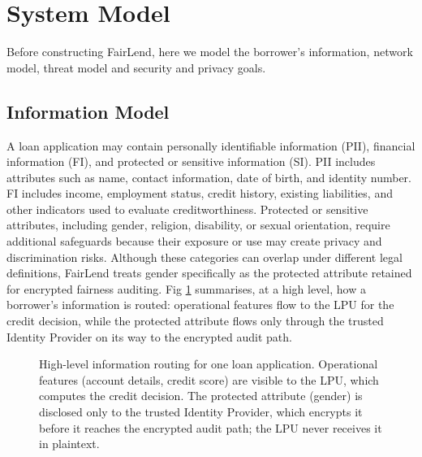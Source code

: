 \documentclass[a4paper,fleqn]{cas-dc}
\begin{document}
\section{System Model}

Before constructing FairLend, here we model the borrower's information, network model, threat model and security and privacy goals. 

\subsection{Information Model}

A loan application may contain personally identifiable information (PII),
financial information (FI), and protected or sensitive information (SI). PII
includes attributes such as name, contact information, date of birth, and
identity number. FI includes income, employment status, credit history,
existing liabilities, and other indicators used to evaluate creditworthiness.
Protected or sensitive attributes, including gender, religion, disability, or
sexual orientation, require additional safeguards because their exposure or
use may create privacy and discrimination risks. Although these categories can
overlap under different legal definitions, FairLend treats gender specifically
as the protected attribute retained for encrypted fairness auditing. Fig \ref{FIG:1} summarises, at a high level, how a borrower's information is routed: operational features flow to the LPU for the credit decision, while the protected attribute flows only through the trusted Identity Provider on its way to the encrypted audit path.

\begin{figure}
	\centering
	\caption{High-level information routing for one loan application. Operational features (account details, credit score) are visible to the LPU, which computes the credit decision. The protected attribute (gender) is disclosed only to the trusted Identity Provider, which encrypts it before it reaches the encrypted audit path; the LPU never receives it in plaintext.}
	\label{FIG:1}
\end{figure}
\end{document}
